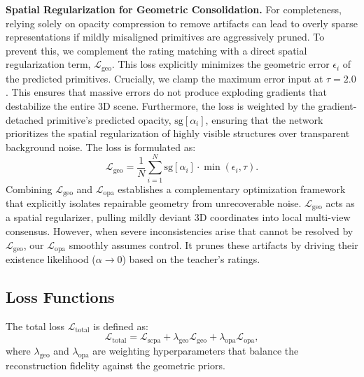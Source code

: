 \noindent \textbf{Spatial Regularization for Geometric Consolidation.} 
For completeness, relying solely on opacity compression to remove artifacts can lead to overly sparse representations if mildly misaligned primitives are aggressively pruned. To prevent this, we complement the rating matching with a direct spatial regularization term, $\mathcal{L}_{\text{geo}}$. This loss explicitly minimizes the geometric error $\epsilon_i$ of the predicted primitives. Crucially, we clamp the maximum error input at $\tau = 2.0$. This ensures that massive errors do not produce exploding gradients that destabilize the entire 3D scene. Furthermore, the loss is weighted by the gradient-detached primitive's predicted opacity, $\text{sg}[\alpha_i]$, ensuring that the network prioritizes the spatial regularization of highly visible structures over transparent background noise. The loss is formulated as:
\begin{equation}
    \mathcal{L}_{\text{geo}} = \frac{1}{N} \sum_{i=1}^{N} \text{sg}[\alpha_i] \cdot  \min(\epsilon_i, \tau).
\end{equation}
Combining $\mathcal{L}_{\text{geo}}$ and $\mathcal{L}_{\text{opa}}$ establishes a complementary optimization framework that explicitly isolates repairable geometry from unrecoverable noise. $\mathcal{L}_{\text{geo}}$ acts as a spatial regularizer, pulling mildly deviant 3D coordinates into local multi-view consensus. However, when severe inconsistencies arise that cannot be resolved by $\mathcal{L}_{\text{geo}}$, our $\mathcal{L}_{\text{opa}}$ smoothly assumes control. It prunes these artifacts by driving their existence likelihood ($\alpha \to 0$) based on the teacher's ratings.


\subsection{Loss Functions}
The total loss $\mathcal{L}_{\text{total}}$ is defined as:
\begin{equation}
    \mathcal{L}_{\text{total}} = \mathcal{L}_{\text{scpa}} + \lambda_\text{geo} \mathcal{L}_{\text{geo}} + \lambda_\text{opa} \mathcal{L}_{\text{opa}},
\end{equation}
where $\lambda_\text{geo}$ and $\lambda_\text{opa}$ are weighting hyperparameters that balance the reconstruction fidelity against the geometric priors.


